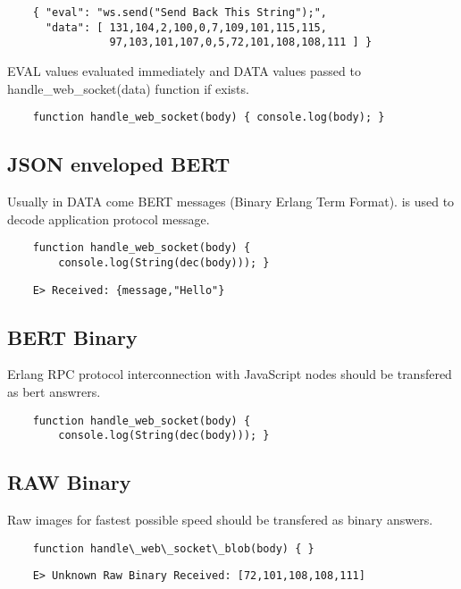 \begin{lstlisting}
    { "eval": "ws.send("Send Back This String");",
      "data": [ 131,104,2,100,0,7,109,101,115,115,
                97,103,101,107,0,5,72,101,108,108,111 ] }
\end{lstlisting}

EVAL values evaluated immediately and DATA values passed
to handle\_web\_socket(data) function if exists.

\begin{lstlisting}
    function handle_web_socket(body) { console.log(body); }
\end{lstlisting}

\subsection{JSON enveloped BERT}

Usually in DATA come BERT messages (Binary Erlang Term Format).
is used to decode application protocol message.

\begin{lstlisting}
    function handle_web_socket(body) {
        console.log(String(dec(body))); }
\end{lstlisting}

\begin{lstlisting}
    E> Received: {message,"Hello"}
\end{lstlisting}

\subsection{BERT Binary}

Erlang RPC protocol interconnection with JavaScript nodes should be transfered as bert answrers.

\begin{lstlisting}
    function handle_web_socket(body) {
        console.log(String(dec(body))); }
\end{lstlisting}

\subsection{RAW Binary}

Raw images for fastest possible speed should be transfered as binary answers.

\begin{lstlisting}
    function handle\_web\_socket\_blob(body) { }
\end{lstlisting}

\begin{lstlisting}
    E> Unknown Raw Binary Received: [72,101,108,108,111]
\end{lstlisting}
